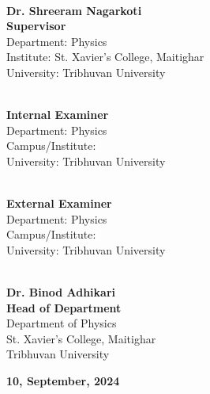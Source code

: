 \vspace{50pt}
\begin{multicols}{2}
	\begin{flushleft}
		\underline{\hspace{5.3cm}} \\
		\textbf{Dr. Shreeram Nagarkoti} \\
		\textbf{Supervisor} \\
		Department: Physics \\
		Institute: St. Xavier's College, Maitighar \\
		University: Tribhuvan University
	\end{flushleft}
	
	\begin{flushleft}
		\vspace{30pt}
		\underline{\hspace{5.3cm}} \\
		\textbf{Internal Examiner} \\
		Department: Physics \\
		Campus/Institute:  \\
		University: Tribhuvan University
	\end{flushleft}
	

	
	\columnbreak
	\begin{flushright}
		\vspace{30pt}
		\underline{\hspace{5.3cm}} \\
		\textbf{External Examiner} \\
		Department: Physics \\
		Campus/Institute:\underline{\hspace{4cm}}  \\
		University: Tribhuvan University
	\end{flushright}
	
	\begin{flushright}
		\vspace{30pt}
		\underline{\hspace{5.3cm}} \\
		\textbf{Dr. Binod Adhikari} \\
		\textbf{Head of Department} \\
		Department of Physics \\
		St. Xavier's College, Maitighar\\
		Tribhuvan University
	\end{flushright}


	
	
	
	
	
\end{multicols}


\vspace{80pt}
\begin{center}
{\fontsize{16}{12}\selectfont \textbf{10, September, 2024}}
\end{center}



                                              